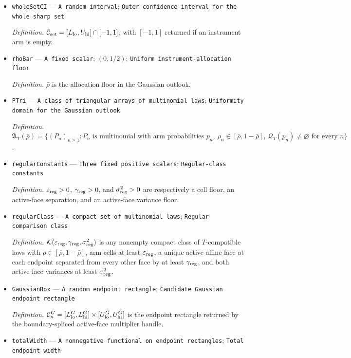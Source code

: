 \documentclass{article}
\begin{document}
\begin{itemize}
  \item \texttt{wholeSetCI} --- \texttt{A random interval}; \texttt{Outer confidence interval for the whole sharp set}
  \par\smallskip\noindent\emph{Definition.} \(\mathcal C_{\rm set}=[L_{\rm lo},U_{\rm hi}]\cap[-1,1]\), with \([-1,1]\) returned if an instrument arm is empty.
  \item \texttt{rhoBar} --- \texttt{A fixed scalar}; \((0,1/2)\); \texttt{Uniform instrument-\allowbreak{}allocation floor}
  \par\smallskip\noindent\emph{Definition.} \(\bar\rho\) is the allocation floor in the Gaussian outlook.
  \item \texttt{PTri} --- \texttt{A class of triangular arrays of multinomial laws}; \texttt{Uniformity domain for the Gaussian outlook}
  \par\smallskip\noindent\emph{Definition.} \(\mathfrak A_T(\bar\rho)=\{(P_n)_{n\geq1}:P_n\text{ is multinomial with arm probabilities }p_n,\ \rho_n\in[\bar\rho,1-\bar\rho],\ \mathcal Q_T(p_n)\neq\varnothing\text{ for every }n\}\).
  \item \texttt{regularConstants} --- \texttt{Three fixed positive scalars}; \texttt{Regular-\allowbreak{}class constants}
  \par\smallskip\noindent\emph{Definition.} \(\varepsilon_{\rm reg}>0\), \(\gamma_{\rm reg}>0\), and \(\sigma^2_{\rm reg}>0\) are respectively a cell floor, an active-face separation, and an active-face variance floor.
  \item \texttt{regularClass} --- \texttt{A compact set of multinomial laws}; \texttt{Regular comparison class}
  \par\smallskip\noindent\emph{Definition.} \(\mathcal K(\varepsilon_{\rm reg},\gamma_{\rm reg},\sigma^2_{\rm reg})\) is any nonempty compact class of \(T\)-compatible laws with \(\rho\in[\bar\rho,1-\bar\rho]\), arm cells at least \(\varepsilon_{\rm reg}\), a unique active affine face at each endpoint separated from every other face by at least \(\gamma_{\rm reg}\), and both active-face variances at least \(\sigma^2_{\rm reg}\).
  \item \texttt{GaussianBox} --- \texttt{A random endpoint rectangle}; \texttt{Candidate Gaussian endpoint rectangle}
  \par\smallskip\noindent\emph{Definition.} \(\mathcal C^G_n=[L^G_{\rm lo},L^G_{\rm hi}]\times[U^G_{\rm lo},U^G_{\rm hi}]\) is the endpoint rectangle returned by the boundary-spliced active-face multiplier handle.
  \item \texttt{totalWidth} --- \texttt{A nonnegative functional on endpoint rectangles}; \texttt{Total endpoint width}

\end{itemize}
\end{document}
